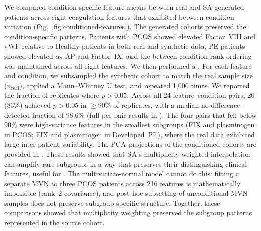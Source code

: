 We compared condition-specific feature means between real and SA-generated patients
across eight coagulation features that exhibited between-condition variation
(Fig.~\ref{fig:conditioned-features}). The generated cohorts preserved the
condition-specific patterns. Patients with PCOS showed elevated Factor~VIII and vWF
relative to Healthy patients in both real and synthetic data, PE patients showed
elevated $\alpha_2$-AP and Factor~IX, and the between-condition rank ordering was
maintained across all eight features. We then performed a . For each feature and condition, we subsampled the
synthetic cohort to match the real sample size ($n_{\text{real}}$), applied a
Mann--Whitney U test, and repeated 1,000 times. We reported the fraction of
replicates where $p > 0.05$,  Across all 24 feature--condition pairs, 20 (83\%) achieved
$p > 0.05$ in $\geq$90\% of replicates, with a median
no-difference-detected fraction of 98.6\% (full per-pair results in
). The four pairs that fell below 90\% were
high-variance features in the smallest subgroups (FIX and plasminogen in PCOS;
FIX and plasminogen in Developed~PE), where the real data exhibited large
inter-patient variability.  The PCA projections of the conditioned cohorts are provided in
. These results showed that SA's multiplicity-weighted
interpolation can amplify rare subgroups in a way that preserves their distinguishing
clinical features, useful for . The multivariate-normal model cannot do this:
fitting a separate MVN to three PCOS patients across 216 features is mathematically
impossible (rank~2 covariance), and post-hoc subsetting of unconditional MVN samples
does not preserve subgroup-specific structure. Together, these comparisons showed that
multiplicity weighting preserved the subgroup patterns represented in the source cohort.


